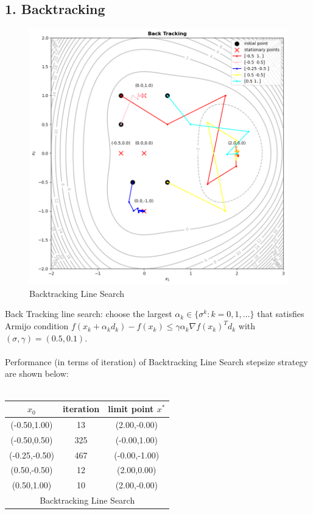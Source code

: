 \documentclass{article}
\begin{document}
\subsection*{1. Backtracking}
\begingroup
\setlength{\intextsep}{0pt}%
\setlength{\columnsep}{0pt}%
\begin{figure}%
  \centering
  \includegraphics[width=\linewidth]{Back Tracking.png}
  \caption{Backtracking Line Search}
\end{figure}

Back Tracking line search: choose the largest $\alpha_k \in \{\sigma^k: k = 0,1,...\}$ that satisfies Armijo condition $f(x_k+\alpha_k d_k)-f(x_k)\leq \gamma \alpha_k \nabla f(x_k)^T d_k$ with $(\sigma, \gamma) = (0.5,0.1)$.\\
\\
Performance (in terms of iteration) of Backtracking Line Search stepsize strategy are shown below:\\
\\
  \begin{tabular}{ccc}
    
    \hline
    $x_0$ & iteration & limit point $x^*$\\
    \hline
          (-0.50,1.00) & 13 & (2.00,-0.00)  \\ %
          (-0.50,0.50) & 325 & (-0.00,1.00) \\ %
          (-0.25,-0.50) & 467 & (-0.00,-1.00)  \\ %
          (0.50,-0.50) & 12 & (2.00,0.00)  \\ %
          (0.50,1.00) & 10 & (2.00,-0.00)  \\ %
          \hline
          \multicolumn{3}{c}{Backtracking Line Search}\\
          \hline
  \end{tabular}
\end{document}
